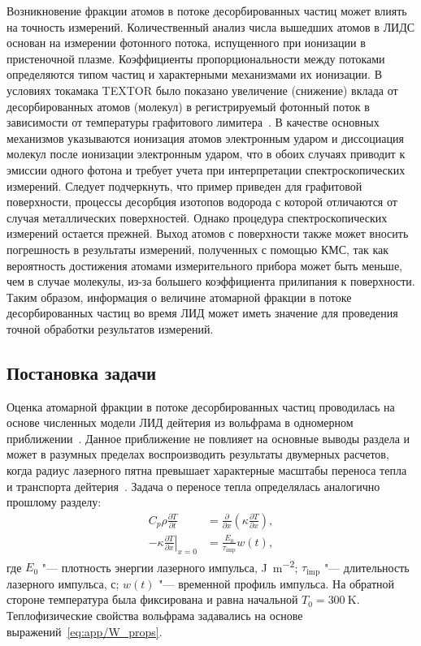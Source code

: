 Возникновение фракции атомов в потоке десорбированных частиц может влиять на точность измерений. Количественный анализ числа вышедших атомов в ЛИДС основан на измерении фотонного потока, испущенного при ионизации в пристеночной плазме. Коэффициенты пропорциональности между потоками определяются типом частиц и характерными механизмами их ионизации. В условиях токамака TEXTOR было показано увеличение (снижение) вклада от десорбированных атомов (молекул) в регистрируемый фотонный поток в зависимости от температуры графитового лимитера~\cite{Brezinsek2005}. В качестве основных механизмов указываются ионизация атомов электронным ударом и диссоциация молекул после ионизации электронным ударом, что в обоих случаях приводит к эмиссии одного фотона и требует учета при интерпретации спектроскопических измерений. Следует подчеркнуть, что пример приведен для графитовой поверхности, процессы десорбция изотопов водорода с которой отличаются от случая металлических поверхностей. Однако процедура спектроскопических измерений остается прежней. Выход атомов с поверхности также может вносить погрешность в результаты измерений, полученных с помощью КМС, так как вероятность достижения атомами измерительного прибора может быть меньше, чем в случае молекулы, из-за большего коэффициента прилипания к поверхности. Таким образом, информация о величине атомарной фракции в потоке десорбированных частиц во время ЛИД может иметь значение для проведения точной обработки результатов измерений.

\subsection{Постановка задачи}\label{subsec:ch4/seс2/subsec1}
Оценка атомарной фракции в потоке десорбированных частиц проводилась на основе численных модели ЛИД дейтерия из вольфрама в одномерном приближении~\cite{Kulagin2023}. Данное приближение не повлияет на основные выводы раздела и может в разумных пределах воспроизводить результаты двумерных расчетов, когда радиус лазерного пятна превышает характерные масштабы переноса тепла и транспорта дейтерия~\cite{Stepanenko2024}. Задача о переносе тепла определялась аналогично прошлому разделу:
\begin{subequations}
    \begin{align}
        C_p \rho \frac{\partial T}{\partial t}                         & = \frac{\partial}{\partial x}\left( \kappa \frac{\partial T}{\partial x} \right), \\
        -\kappa \left. \frac{\partial T}{\partial x} \right\vert_{x=0} & = \frac{E_0}{\tau_\mathrm{imp}} w(t),
    \end{align}
\end{subequations}
где \( E_0 \) "--- плотность энергии лазерного импульса, \si{\joule\per\meter\squared}; \( \tau_\mathrm{imp} \) "--- длительность лазерного импульса, с; \(w(t) \) "--- временной профиль импульса. На обратной стороне температура была фиксирована и равна начальной \(T_0=\SI{300}{\kelvin}\). Теплофизические свойства вольфрама задавались на основе выражений~\cref{eq:app/W_props}.

